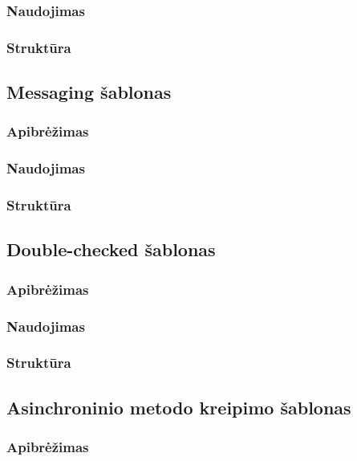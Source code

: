 \documentclass[10pt]{IEEEtran}
\begin{document}
			\subsubsection{Naudojimas}

			\subsubsection{Struktūra}

		\subsection{Messaging šablonas}

			\subsubsection{Apibrėžimas}

			\subsubsection{Naudojimas}

			\subsubsection{Struktūra}

		\subsection{Double-checked šablonas}

			\subsubsection{Apibrėžimas}

			\subsubsection{Naudojimas}

			\subsubsection{Struktūra}

		\subsection{Asinchroninio metodo kreipimo šablonas}

			\subsubsection{Apibrėžimas}
\end{document}
